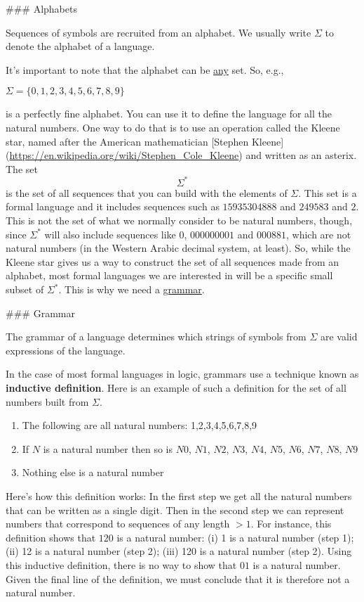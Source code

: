 \documentclass[11pt]{article}
\begin{document}
\#\#\# Alphabets 

Sequences of symbols are recruited from an alphabet. We
usually write \(\Sigma\) to denote the alphabet of a language. 

It's important to note that the alphabet can be \uline{any} set. So, e.g., 

\(\Sigma=\{0,1,2,3,4,5,6,7,8,9\}\)

is a perfectly fine alphabet. You can use it to define the language for all the natural numbers. One way to do that is to use an operation called the Kleene star, named after the American mathematician [Stephen Kleene](\url{https://en.wikipedia.org/wiki/Stephen\_Cole\_Kleene}) and written as an asterix. The set $$\Sigma^*$$ is the set of all sequences that you can build with the elements of \(\Sigma\). This set is a formal language and it includes sequences such as \(15935304888\) and \(249583\) and \(2\). This is not the set of what we normally consider to be natural numbers, though, since \(\Sigma^*\) will also include sequences like \(0\), \(000000001\) and \(000881\), which are not natural numbers (in the Western Arabic decimal system, at least). So, while the Kleene star gives us a way to construct the set of all sequences made from an alphabet, most formal languages we are interested in will be a specific small subset of \(\Sigma^*\). This is why we need a \uline{grammar}.

\#\#\# Grammar 

The grammar of a language determines which strings of symbols from \(\Sigma\) are valid expressions of the language. 

In the case of most formal languages in logic, grammars use a technique known as
\textbf{\textbf{inductive definition}}. Here is an example of such a definition for the set of all numbers built from \(\Sigma\).

\begin{enumerate}
\item The following are all natural numbers: 1,2,3,4,5,6,7,8,9
\item If \(N\) is a natural number then so is \(N0\), \(N1\), \(N2\), \(N3\), \(N4\), \(N5\), \(N6\), \(N7\), \(N8\), \(N9\)
\item Nothing else is a natural number
\end{enumerate}

Here's how this definition works: In the first step we get all the natural numbers that can be written as a single digit. Then in the second step we can represent numbers that correspond to sequences of any length \(>1\). For instance, this definition shows that \(120\) is a natural number: (i) 1 is a natural number (step 1); (ii) 12 is a natural number (step 2); (iii) 120 is a natural number (step 2). Using this inductive definition, there is no way to show that \(01\) is a natural number. Given the final line of the definition, we must conclude that it is therefore not a natural number.
\end{document}
